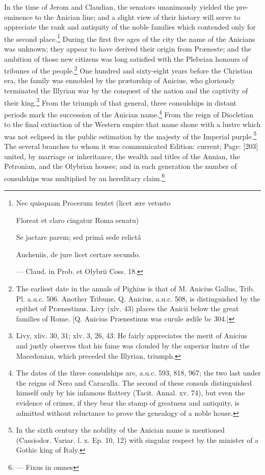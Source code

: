 In the time of Jerom and Claudian, the senators unanimously yielded the pre-eminence to the Anician line; and a slight view of their history will serve to appreciate the rank and antiquity of the noble families which contended only for the second place.\footnote{Nec quisquam Procerum tentet (licet ære vetusto

Floreat et claro cingatur Roma senatu)

Se jactare parem; sed primâ sede relictâ

Aucheniis, de jure licet certare secundo.

\texthebrew{—} Claud. in Prob. et Olybrii Coss. 18.} During the first five ages of the city the name of the Anicians was unknown; they appear to have derived their origin from Præneste; and the ambition of those new citizens was long satisfied with the Plebeian honours of tribunes of the people.\footnote{The earliest date in the annals of Pighius is that of M. Anicius Gallus, Trib. Pl. a.u.c. 506. Another Tribune, Q. Anicius, a.u.c. 508, is distinguished by the epithet of Prænestinus. Livy (xlv. 43) places the Anicii below the great families of Rome. [Q. Anicius Prænestinus was curule ædile bc 304.]} One hundred and sixty-eight years before the Christian era, the family was ennobled by the prætorship of Anicius, who gloriously terminated the Illyrian war by the conquest of the nation and the captivity of their king.\footnote{Livy, xliv. 30, 31; xlv. 3, 26, 43. He fairly appreciates the merit of Anicius and justly observes that his fame was clouded by the superior lustre of the Macedonian, which preceded the Illyrian, triumph.} From the triumph of that general, three consulships in distant periods mark the succession of the Anician name.\footnote{The dates of the three consulships are, a.u.c. 593, 818, 967; the two last under the reigns of Nero and Caracalla. The second of these consuls distinguished himself only by his infamous flattery (Tacit. Annal. xv. 74), but even the evidence of crimes, if they bear the stamp of greatness and antiquity, is admitted without reluctance to prove the genealogy of a noble house.} From the reign of Diocletian to the final extinction of the Western empire that name shone with a lustre which was not eclipsed in the public estimation by the majesty of the Imperial purple.\footnote{In the sixth century the nobility of the Anician name is mentioned (Cassiodor. Variar. l. x. Ep. 10, 12) with singular respect by the minister of a Gothic king of Italy.} The several branches to whom it was communicated Edition: current; Page: [203] united, by marriage or inheritance, the wealth and titles of the Annian, the Petronian, and the Olybrian houses; and in each generation the number of consulships was multiplied by an hereditary claim.\footnote{\texthebrew{—} Fixus in omnes

}
